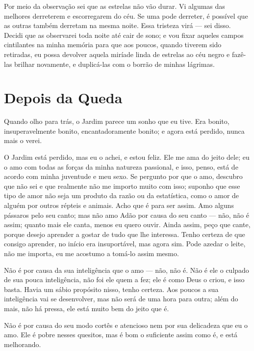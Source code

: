 Por meio da observação sei que as estrelas não vão durar. Vi algumas das
melhores derreterem e escorregarem do céu. Se uma pode derreter, é possível
que as outras também derretam na mesma noite. Essa tristeza virá --- sei
disso. Decidi que as observarei toda noite até cair de sono;
e vou fixar aqueles campos cintilantes na minha memória para que aos poucos,
quando tiverem sido retiradas, eu possa devolver aquela miríade linda de
estrelas ao céu negro e fazê-las brilhar novamente, e duplicá-las com o 
borrão de minhas lágrimas.

\begin{center}
\leafNE
\end{center}

\section{Depois da Queda}

Quando olho para trás, o Jardim parece um sonho que eu tive. Era bonito,
insuperavelmente bonito, encantadoramente bonito; e agora está perdido,
nunca mais o verei.

O Jardim está perdido, mas eu o achei, e estou feliz. Ele me ama do jeito dele;
eu o amo com todas as forças da minha natureza passional, e isso, penso, está de
acordo com minha juventude e meu sexo. Se pergunto por que o amo, descubro que
não sei e que realmente não me importo muito com isso; suponho que esse
tipo de amor não seja um produto da razão ou da estatística, como o amor de alguém
por outros répteis e animais. Acho que é para ser assim. Amo alguns pássaros pelo
seu canto; mas não amo Adão por causa do seu canto --- não, não é assim; quanto
mais ele canta, menos eu quero ouvir. Ainda assim, peço que cante, porque
desejo aprender a gostar de tudo que lhe interessa. Tenho certeza de que consigo
aprender, no início era insuportável, mas agora sim. Pode azedar o leite,
não me importa, eu me acostumo a tomá-lo assim mesmo.

Não é por causa da sua inteligência que o amo --- não, não é. Não é ele o culpado
de sua pouca inteligência, não foi ele quem a fez; ele é como Deus o
criou, e isso basta. Havia um sábio propósito nisso, tenho certeza. Aos poucos
a sua inteligência vai se desenvolver, mas não será de uma hora para outra; além do mais, 
não há pressa, ele está muito bem do jeito que é.

Não é por causa do seu modo cortês e atencioso nem por sua delicadeza que eu o
amo. Ele é pobre nesses quesitos, mas é bom o suficiente assim como é, e está
melhorando.

